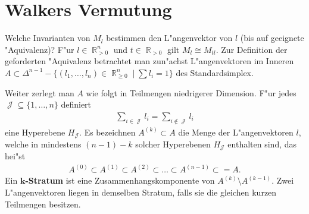 \documentclass[paper=A4, twoside, chapterprefix=true, bibliography=totoc, headsepline]{scrbook}
\newcommand{\tikzgitter}[3][0.25]{ %
	\draw[step=#1,gray!15] #2 grid #3;
	\draw[step=2*#1,gray!30] #2 grid #3;
	\fill (0,0) circle(0.1); 
}
\DeclareMathOperator{\R}{\mathbb{R}}
\DeclareMathOperator{\calJ}{{\mathcal{J}}}
\theoremstyle{nonumberbreak}
\theoremstyle{emptybreak}
\theoremstyle{break}
\newcommand{\DefTerm}[2][]{\ifthenelse{\isempty{#1}}{\index{#2}}{\index{#1}}#2}
\newcommand{\defi}[2][]{\textbf{\DefTerm[#1]{#2}}}
\begin{document}
\section{Walkers Vermutung}

Welche Invarianten von $M_l$ bestimmen den L"angenvektor von $l$ (bis auf geeignete "Aquivalenz)?
F"ur $l \in \R_{>0}^n$ und $t \in \R_{> 0}$ gilt $M_l \cong M_{tl}$.
Zur Definition der geforderten "Aquivalenz betrachtet man zun"achst L"angenvektoren im Inneren $A \subset \Delta^{n-1} - \{ (l_1, \ldots, l_n) \in \R_{\ge 0}^n \mid \sum l_i = 1\}$ des Standardsimplex.

Weiter zerlegt man $A$ wie folgt in Teilmengen niedrigerer Dimension.
F"ur jedes $\calJ \subseteq \{1, \ldots, n\}$ definiert
\begin{align*}
	\sum_{i \in \calJ} l_i = \sum_{i \notin \calJ} l_i
\end{align*}
eine Hyperebene $H_{\calJ}$.
Es bezeichnen $A^{(k)} \subset A$ die Menge der L"angenvektoren $l$, welche in mindestens $(n-1)-k$ solcher Hyperebenen $H_{\calJ}$ enthalten sind, das hei"st
\begin{align*}
	A^{(0)} \subset A^{(1)} \subset A^{(2)} \subset \ldots \subset A^{(n-1)} \subset = A.
\end{align*}
Ein \defi[Stratum]{$\bm{k}$-Stratum} ist eine Zusammenhangskomponente von $A^{(k)} \setminus A^{(k-1)}$.
Zwei L"angenvektoren liegen in demselben Stratum, falls sie die gleichen kurzen Teilmengen besitzen.
\begin{center}\end{center}
\end{document}
